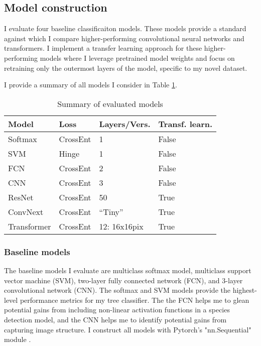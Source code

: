 \documentclass[10pt,twocolumn,letterpaper]{article}
\begin{document}
\subsection{Model construction}
\label{sec:models}
I evaluate four baseline classificaiton models. These models provide a standard against which I compare higher-performing convolutional neural networks and transformers. I implement a transfer learning approach for these higher-performing models where I leverage pretrained model weights and focus on retraining only the outermost layers of the model, specific to my novel dataset.

I provide a summary of all models I consider in Table \ref{tab:model_desc}.

\begin{table}[!htbp]
  \begin{center}
    \small
  \begin{tabular}{|l|l|l|l|}
  \hline
  Model & Loss & Layers/Vers. & Transf. learn.\\
  \hline\hline
  Softmax & CrossEnt & 1 & False \\
  SVM & Hinge & 1 & False \\
  FCN & CrossEnt & 2 & False \\
  CNN & CrossEnt & 3 & False \\
  ResNet & CrossEnt & 50 & True \\
  ConvNext & CrossEnt & ``Tiny'' & True \\
  Transformer & CrossEnt & 12: 16x16pix & True \\
  \hline
  \end{tabular}
  \end{center}
  \caption{\label{tab:model_desc} Summary of evaluated models}
  \end{table}

\subsubsection{Baseline models}
The baseline models I evaluate are multiclass softmax model, multiclass support vector machine (SVM), two-layer fully connected network (FCN), and 3-layer convolutional network (CNN). The softmax and SVM models provide the highest-level performance metrics for my tree classifier. The the FCN helps me to glean potential gains from including non-linear activation functions in a species detection model, and the CNN helps me to identify potential gains from capturing image structure. I construct all models with Pytorch's "nn.Sequential" module \cite{PyTorch}.
\end{document}
